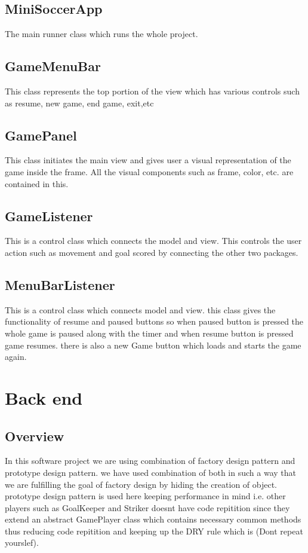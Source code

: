 \documentclass[12pt, dvipsnames, a4paper]{article}
\begin{document}
\subsection{MiniSoccerApp}
The main runner class which runs the whole project.
\subsection{GameMenuBar}
This class represents the top portion of the view which has various controls such as resume, new game, end game, exit,etc
\subsection{GamePanel}
This class initiates the main view and gives user a visual representation of the game inside the frame. All the visual components
such as frame, color, etc. are contained in this.
\subsection{GameListener}
This is a control class which connects the model and view. This controls the user action such as movement and goal scored by connecting
the other two packages.
\subsection{MenuBarListener}
This is a control class which connects model and view. this class gives the functionality of resume and paused buttons so when
paused button is pressed the whole game is paused along with the timer and when resume button is pressed game resumes. there is also
a new Game button which loads and starts the game again.
\clearpage

\section{Back end}
\subsection{Overview}
In this software project we are using combination of factory design pattern and prototype design pattern.
we have used combination of both in such a way that we are fulfilling the goal of factory design by hiding the
creation of object. prototype design pattern is used here keeping performance in mind i.e. other players such as
GoalKeeper and Striker doesnt have code repitition since they extend an abstract GamePlayer class which contains
necessary common methods thus reducing code repitition and keeping up the DRY rule which is (Dont repeat yourslef).
\end{document}
